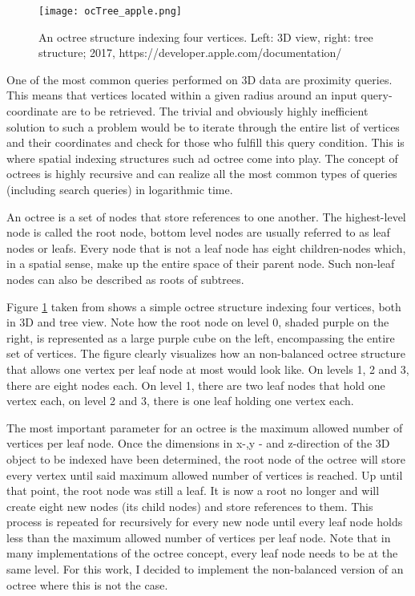 \begin{figure}[htb]
  \centering
  \texttt{[image: ocTree\_apple.png]}\\ %
  \caption{An octree structure indexing four vertices. Left: 3D view, right: tree structure; 2017, https://developer.apple.com/documentation/}\label{fig:ocTree_apple}
\end{figure}

One of the most common queries performed on 3D data are proximity queries. This means that vertices located within a given radius around an input query-coordinate are to be retrieved. The trivial and obviously highly inefficient solution to such a problem would be to iterate through the entire list of vertices and their coordinates and check for those who fulfill this query condition. This is where spatial indexing structures such ad octree come into play. The concept of octrees is highly recursive and can realize all the most common types of queries (including search queries) in logarithmic time.

An octree is a set of nodes that store references to one another. The highest-level node is called the root node, bottom level nodes are usually referred to as leaf nodes or leafs. Every node that is not a leaf node has eight children-nodes which, in a spatial sense, make up the entire space of their parent node. Such non-leaf nodes can also be described as roots of subtrees.

Figure \ref{fig:ocTree_apple} taken from \cite{octAp} shows a simple octree structure indexing four vertices, both in 3D and tree view. Note how the root node on level 0, shaded purple on the right, is represented as a large purple cube on the left, encompassing the entire set of vertices. The figure clearly visualizes how an non-balanced octree structure that allows one vertex per leaf node at most would look like. On levels 1, 2 and 3, there are eight nodes each. On level 1, there are two leaf nodes that hold one vertex each, on level 2 and 3, there is one leaf holding one vertex each.

The most important parameter for an octree is the maximum allowed number of vertices per leaf node. Once the dimensions in x-,y - and z-direction of the 3D object to be indexed have been determined, the root node of the octree will store every vertex until said maximum allowed number of vertices is reached. Up until that point, the root node was still a leaf. It is now a root no longer and will create eight new nodes (its child nodes) and store references to them. This process is repeated for recursively for every new node until every leaf node holds less than the maximum allowed number of vertices per leaf node. Note that in many implementations of the octree concept, every leaf node needs to be at the same level. For this work, I decided to implement the non-balanced version of an octree where this is not the case.

